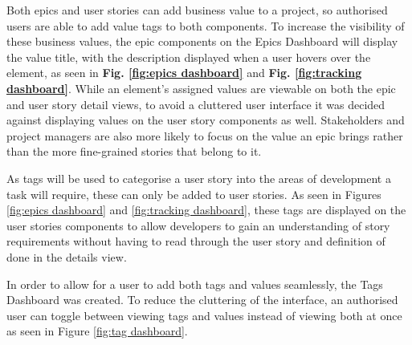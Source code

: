 \documentclass[l4proj.tex]{subfiles}
\begin{document}
Both epics and user stories can add business value to a project, so authorised users are able to add value tags to both components. To increase the visibility of these business values, the epic components on the Epics Dashboard will display the value title, with the description displayed when a user hovers over the element, as seen in \textbf{Fig. \ref{fig:epics dashboard}} and \textbf{Fig. \ref{fig:tracking dashboard}}. While an element's assigned values are viewable on both the epic and user story detail views, to avoid a cluttered user interface it was decided against displaying values on the user story components as well. Stakeholders and project managers are also more likely to focus on the value an epic brings rather than the more fine-grained stories that belong to it. 

As tags will be used to categorise a user story into the areas of development a task will require, these can only be added to user stories. As seen in Figures \ref{fig:epics dashboard} and \ref{fig:tracking dashboard}, these tags are displayed on the user stories components to allow developers to gain an understanding of story requirements without having to read through the user story and definition of done in the details view. 

In order to allow for a user to add both tags and values seamlessly, the Tags Dashboard was created. To reduce the cluttering of the interface, an authorised user can toggle between viewing tags and values instead of viewing both at once as seen in Figure \ref{fig:tag dashboard}.
\end{document}
